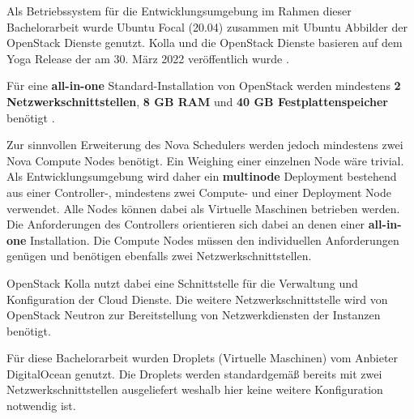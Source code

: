\documentclass[../Main.tex]{subfiles}
\begin{document}
Als Betriebssystem für die Entwicklungsumgebung im Rahmen dieser Bachelorarbeit wurde Ubuntu Focal (20.04) zusammen mit Ubuntu Abbilder
der OpenStack Dienste genutzt. Kolla und die OpenStack Dienste basieren auf dem Yoga Release der am 30. März 2022 veröffentlich wurde \citep{OpenstackYogaRelease}.

Für eine \textbf{all-in-one} Standard-Installation von OpenStack werden mindestens \textbf{2 Netzwerkschnittstellen},
\textbf{8 GB RAM} und \textbf{40 GB Festplattenspeicher} benötigt \citep{KollaQuickStart}.

Zur sinnvollen Erweiterung des Nova Schedulers werden jedoch mindestens zwei Nova Compute Nodes benötigt.
Ein Weighing einer einzelnen Node wäre trivial. Als Entwicklungsumgebung wird daher ein \textbf{multinode}
Deployment bestehend aus einer Controller-, mindestens zwei Compute- und einer Deployment Node verwendet.
Alle Nodes können dabei als Virtuelle Maschinen betrieben werden. Die Anforderungen des Controllers orientieren
sich dabei an denen einer \textbf{all-in-one} Installation. Die Compute Nodes müssen den individuellen Anforderungen
genügen und benötigen ebenfalls zwei Netzwerkschnittstellen.

OpenStack Kolla nutzt dabei eine Schnittstelle für die Verwaltung und Konfiguration der Cloud Dienste.
Die weitere Netzwerkschnittstelle wird von OpenStack Neutron zur Bereitstellung von Netzwerkdiensten der Instanzen benötigt.

Für diese Bachelorarbeit wurden Droplets (Virtuelle Maschinen) vom Anbieter DigitalOcean genutzt. Die Droplets
werden standardgemä{\ss} bereits mit zwei Netzwerkschnittstellen ausgeliefert weshalb hier keine weitere
Konfiguration notwendig ist.

\biblio %
\end{document}
